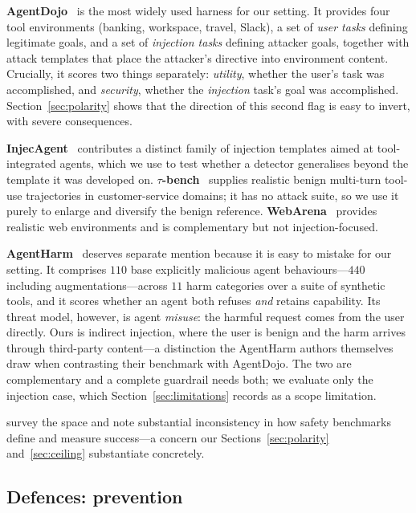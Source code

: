 \documentclass[preprint,12pt,authoryear]{elsarticle}
\theoremstyle{definition}
\begin{document}
\textbf{AgentDojo}~\citep{debenedetti2024agentdojo} is the most widely used
harness for our setting. It provides four tool environments (banking, workspace,
travel, Slack), a set of \emph{user tasks} defining legitimate goals, and a set of
\emph{injection tasks} defining attacker goals, together with attack templates
that place the attacker's directive into environment content. Crucially, it scores
two things separately: \emph{utility}, whether the user's task was accomplished,
and \emph{security}, whether the \emph{injection} task's goal was accomplished.
Section~\ref{sec:polarity} shows that the direction of this second flag is easy
to invert, with severe consequences.

\textbf{InjecAgent}~\citep{zhan2024injecagent} contributes a distinct family of
injection templates aimed at tool-integrated agents, which we use to test whether
a detector generalises beyond the template it was developed on.
\textbf{$\tau$-bench}~\citep{yao2024taubench} supplies realistic benign
multi-turn tool-use trajectories in customer-service domains; it has no attack
suite, so we use it purely to enlarge and diversify the benign reference.
\textbf{WebArena}~\citep{zhou2023webarena} provides realistic web environments
and is complementary but not injection-focused.

\textbf{AgentHarm}~\citep{andriushchenko2025agentharm} deserves separate mention
because it is easy to mistake for our setting. It comprises $110$ base explicitly
malicious agent behaviours---$440$ including augmentations---across $11$ harm categories over
a suite of synthetic tools, and it scores whether an agent both refuses \emph{and}
retains capability. Its threat model, however, is agent \emph{misuse}: the harmful request
comes from the user directly. Ours is indirect injection, where the user is benign
and the harm arrives through third-party content---a distinction the AgentHarm
authors themselves draw when contrasting their benchmark with AgentDojo. The two
are complementary and a complete guardrail needs both; we evaluate only the
injection case, which Section~\ref{sec:limitations} records as a scope
limitation.

\citet{li2026taxonomy} survey the space and note substantial inconsistency in
how safety benchmarks define and measure success---a concern our
Sections~\ref{sec:polarity} and~\ref{sec:ceiling} substantiate concretely.

\subsection{Defences: prevention}
\end{document}
